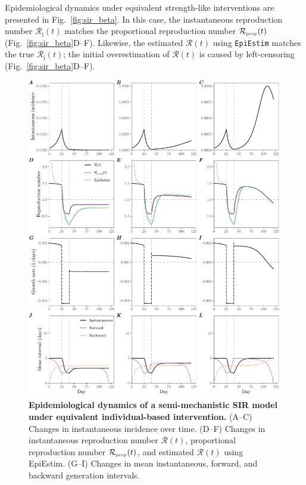 \documentclass[12pt]{article}
\newcommand{\fref}[1]{Fig.~\ref{fig:#1}}
\newcommand{\Rx}[1]{\ensuremath{{\mathcal R}_{#1}}\xspace}
\newcommand{\Ri}{\Rx{\mathrm{i}}}
\newcommand{\RR}{\ensuremath{{\mathcal R}}\xspace}
\newcommand{\tsub}[2]{#1_{{\textrm{\tiny #2}}}}
\begin{document}
Epidemiological dynamics under equivalent strength-like interventions are presented in \fref{sir_beta}.
In this case, the instantaneous reproduction number $\Ri(t)$ matches the proportional reproduction number $\tsub{\RR}{prop}(t)$ (\fref{sir_beta}D--F).
Likewise, the estimated $\RR(t)$ using \texttt{EpiEstim} matches the true $\Ri(t)$;
the initial overestimation of $\RR(t)$ is caused by left-censoring (\fref{sir_beta}D--F).

\begin{figure}
\includegraphics[width=\textwidth]{figure_sir_semi.pdf}
\caption{
\textbf{Epidemiological dynamics of a semi-mechanistic SIR model under equivalent individual-based intervention.}
(A--C) Changes in instantaneous incidence over time.
(D--F) Changes in instantaneous reproduction number $\RR(t)$, proportional reproduction number $\tsub{\RR}{prop}(t)$, and estimated $\RR(t)$ using EpiEstim.
(G--I) Changes in mean instantaneous, forward, and backward generation intervals.
}
\label{fig:sir_semi}
\end{figure}
\end{document}
